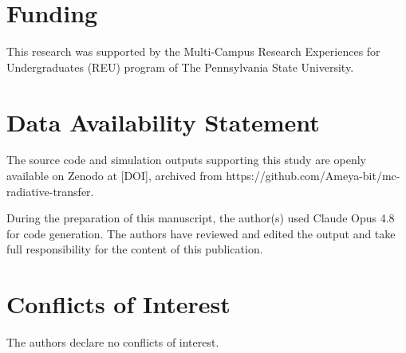 \documentclass[twocolumn]{aastex701}
\begin{document}
\section*{Funding}
This research was supported by the Multi-Campus Research Experiences for Undergraduates
(REU) program of The Pennsylvania State University.

\section*{Data Availability Statement}
The source code and simulation outputs supporting this study are
openly available on Zenodo at [DOI], archived from
https://github.com/Ameya-bit/mc-radiative-transfer.

\begin{acknowledgments}
During the preparation of this manuscript, the author(s) used Claude Opus 4.8 for
code generation. The authors have reviewed and edited the output and take full
responsibility for the content of this publication.
\end{acknowledgments}

\section*{Conflicts of Interest}
The authors declare no conflicts of interest.




\end{document}
